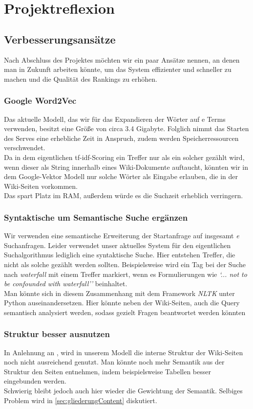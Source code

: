 \documentclass[12pt,pdftex,a4paper]{article}
\begin{document}
\pagebreak

\section{Projektreflexion}
\subsection{Verbesserungsansätze}
Nach Abschluss des Projektes möchten wir ein paar Ansätze nennen, an denen man in Zukunft arbeiten könnte, um das System effizienter und schneller zu machen und die Qualität des Rankings zu erhöhen.
\subsubsection{Google Word2Vec}
Das aktuelle Modell, das wir für das Expandieren der Wörter auf e Terms verwenden, besitzt eine Größe von circa 3.4 Gigabyte. Folglich nimmt das Starten des Serves eine erhebliche Zeit in Anspruch, zudem werden Speicherressourcen verschwendet.\\
Da in dem eigentlichen tf-idf-Scoring ein Treffer nur als ein solcher gezählt wird, wenn dieser als String innerhalb eines Wiki-Dokumente auftaucht, könnten wir in dem Google-Vektor Modell nur solche Wörter als Eingabe erlauben, die in der Wiki-Seiten vorkommen.\\
Das spart Platz im RAM, außerdem würde es die Suchzeit erheblich verringern.

\subsubsection{Syntaktische um Semantische Suche ergänzen}\label{sec:semantikInSuche}
Wir verwenden eine semantische Erweiterung der Startanfrage auf insgesamt \textit{e} Suchanfragen. Leider verwendet unser aktuelles System für den eigentlichen Suchalgorithmus lediglich eine syntaktische Suche. Hier entstehen Treffer, die nicht als solche gezählt werden sollten. Beispielsweise wird ein Tag bei der Suche nach \textit{waterfall} mit einem Treffer markiert, wenn es Formulierungen wie \textit{`... not to be confounded with waterfall''} beinhaltet.\\
Man könnte sich in diesem Zusammenhang mit dem Framework \textit{NLTK} unter Python auseinandersetzen. Hier könnte neben der Wiki-Seiten, auch die Query semantisch analysiert werden, sodass gezielt Fragen beantwortet werden könnten
\subsubsection{Struktur besser ausnutzen}
In Anlehnung an , wird in unserem Modell die interne Struktur der Wiki-Seiten noch nicht ausreichend genutzt. Man könnte noch mehr Semantik aus der Struktur den Seiten entnehmen, indem beispielsweise Tabellen besser eingebunden werden. \\
Schwierig bleibt jedoch auch hier wieder die Gewichtung der Semantik. Selbiges Problem wird in \autoref{sec:gliederungContent} diskutiert.
\end{document}
